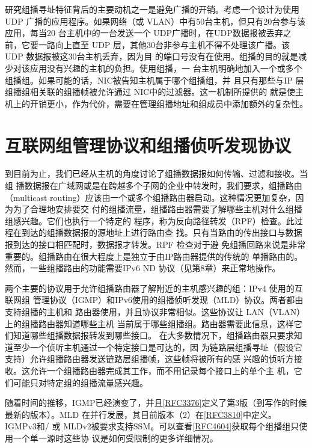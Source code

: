 研究组播寻址特征背后的主要动机之一是避免广播的开销。考虑一个设计为使用UDP
广播的应用程序。如果网络（或 VLAN）中有50台主机，但只有20台参与该应用，每当20
台主机中的一台发送一个 UDP广播时，在UDP数据报被丢弃之前，它要一路向上直至 UDP
层，其他30台非参与主机不得不处理该广播。该UDP 数据报被这30台主机丢弃，因为目
的端口号没有在使用。组播的目的就是减少对该应用没有兴趣的主机的负担。使用组播，一
台主机明确地加入一个或多个组播组。如果可能的话，NIC被告知主机属于哪个组播组，并
且只有那些与IP 层组播组相关联的组播帧被允许通过 NIC中的过滤器。这一机制所提供的
就是使主机上的开销更小，作为代价，需要在管理组播地址和组成员中添加额外的复杂性。

\section{互联网组管理协议和组播侦听发现协议}

到目前为止，我们已经从主机的角度讨论了组播数据报如何传输、过滤和接收。当组
播数据报在广域网或是在跨越多个子网的企业中转发时，我们要求，组播路由（multicast
routing）应该由一个或多个组播路由器启动。这种情况更加复杂，因为为了合理地安排要交
付的组播流量，组播路由器需要了解哪些主机对什么组播组感兴趣。它们也执行一个特定的
程序，称为反向路径转发（RPF）检查。此过程在到达的组播数据报的源地址上进行路由查
找。只有当路由的传出接口与数据报到达的接口相匹配时，数据报才转发。RPF 检查对于避
免组播回路来说是非常重要的。组播路由在很大程度上是独立于由IP路由器提供的传统的
单播路由的。然而，一些组播路由的功能需要IPv6 ND 协议（见第8章）来正常地操作。

两个主要的协议用于允许组播路由器了解附近的主机感兴趣的组：IPv4 使用的互联网组
管理协议（IGMP）和IPv6使用的组播侦听发现（MLD）协议。两者都由支持组播的主机和
路由器使用，并且协议非常相似。这些协议让 LAN（VLAN）上的组播路由器知道哪些主机
当前属于哪些组播组。路由器需要此信息，这样它们知道哪些组播数据报转发到哪些接口。
在大多数情况下，组播路由器只要求知道至少一个侦听主机通过一个特定接口是可达的，因
为链路层组播寻址（假设它支持）允许组播路由器发送链路层组播帧，这些帧将被所有的感
兴趣的侦听方接收。这允许一个组播路由器完成其工作，而不用记录每个接口上的单个主
机，它们可能只对特定组的组播流量感兴趣。

随着时间的推移，IGMP已经演变了，并且\href{https://www.rfc-editor.org/rfc/rfc3376}{[RFC3376]}定义了第3版（到写作的时候
最新的版本）。MLD 在并行发展，其目前版本（2）在\href{https://www.rfc-editor.org/rfc/rfc3810}{[RFC3810]}中定义。IGMPv3和/ 或
MLDv2被要求支持SSM。可以查看\href{https://www.rfc-editor.org/rfc/rfc4604}{[RFC4604]}获取每个组播组只使用一个单一源时这些协
议是如何受限制的更多详细情况。

